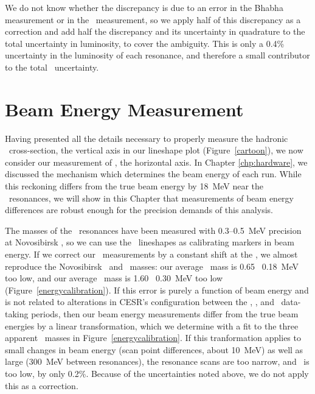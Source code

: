 \documentclass{cornell}
\begin{document}
We do not know whether the discrepancy is due to an error in the
Bhabha measurement or in the \gamgam\ measurement, so we apply half of
this discrepancy as a correction and add half the discrepancy and its
uncertainty in quadrature to the total uncertainty in luminosity, to
cover the ambiguity.  This is only a 0.4\% uncertainty in the
luminosity of each resonance, and therefore a small contributor to the
total \gee\ uncertainty.

\chapter{Beam Energy Measurement}
\label{chp:beamenergy}

Having presented all the details necessary to properly measure the
hadronic \ups\ cross-section, the vertical axis in our lineshape plot
(Figure~\ref{cartoon}), we now consider our measurement of \ecm, the
horizontal axis.  In Chapter \ref{chp:hardware}, we discussed the
mechanism which determines the beam energy of each run.  While this
reckoning differs from the true beam energy by 18~MeV near the \ups\
resonances, we will show in this Chapter that measurements of beam
energy differences are robust enough for the precision demands of this
analysis.

The masses of the \ups\ resonances have been measured with
0.3--0.5~MeV precision at Novosibirsk \cite{novomass}, so we can use
the \ups\ lineshapes as calibrating markers in beam energy.  If we
correct our \ecm\ measurements by a constant shift at the \us, we
almost reproduce the Novosibirsk \uss\ and \usss\ masses: our average
\uss\ mass is 0.65 \PM\ 0.18~MeV too low, and our average \usss\ mass
is 1.60 \PM\ 0.30~MeV too low (Figure~\ref{energycalibration}).  If
this error is purely a function of beam energy and is not related to
alterations in CESR's configuration between the \usss, \us, and \uss\
data-taking periods, then our beam energy measurements differ from the
true beam energies by a linear transformation, which we determine with
a fit to the three apparent \ups\ masses in
Figure~\ref{energycalibration}.  If this tranformation applies to
small changes in beam energy (scan point differences, about 10~MeV) as
well as large (300~MeV between resonances), the resonance scans are
too narrow, and \geehadtot\ is too low, by only 0.2\%.  Because of the
uncertainties noted above, we do not apply this as a correction.
\end{document}
